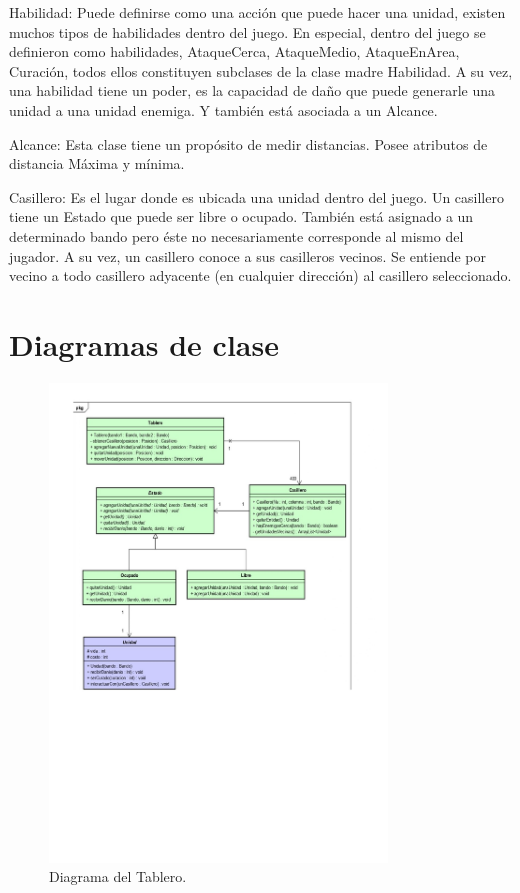 \documentclass[titlepage,a4paper]{article}
\begin{document}
Habilidad: Puede definirse como una acción que puede hacer una unidad, existen muchos tipos de habilidades dentro del juego. En especial, dentro del juego se definieron como habilidades, AtaqueCerca, AtaqueMedio, AtaqueEnArea, Curación, todos ellos constituyen subclases de la clase madre Habilidad. A su vez, una habilidad tiene un poder, es la capacidad de daño que puede generarle una unidad a una unidad enemiga. Y también está asociada a un Alcance. 

Alcance: Esta clase tiene un propósito de medir distancias. Posee atributos de distancia Máxima y mínima. 

Casillero: Es el lugar donde es ubicada una unidad dentro del juego.  Un casillero tiene un Estado que puede ser libre o ocupado. También está asignado a un determinado bando pero éste no necesariamente corresponde al mismo del jugador. A su vez, un casillero conoce a sus casilleros vecinos. Se entiende por vecino a todo casillero adyacente (en cualquier dirección) al casillero seleccionado. 


\section{Diagramas de clase}\label{sec:diagramasdeclase}



\begin{figure}[H]
\centering
\includegraphics[width=0.8\textwidth]{TABLEROV1_page-0001.jpg}
\caption{\label{fig:class01}Diagrama del Tablero.}

\end{figure}
\end{document}
